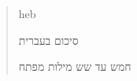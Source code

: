 \begin{abstract}
    \markboth{\abstractname}{}
\begin{scontents}[store-env=lang]
heb
\end{scontents}
\begin{scontents}[store-env=abstracts,print-env=true]
סיכום בעברית
\end{scontents}

\begin{scontents}[store-env=keywords,print-env=true]
חמש עד שש מילות מפתח
\end{scontents}
\end{abstract}
\cleardoublepage
{}
